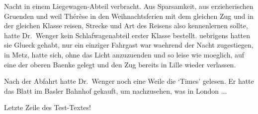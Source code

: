Nacht in einem Liege\-wagen-Abteil verbracht.
Aus Sparsamkeit, aus erzieherischen
Gruenden und weil
Th\'e\-r\`ese in den Weihnachtsferien mit dem gleichen
Zug und in der gleichen Klasse reisen, Strecke und
Art des Reisens also kennenlernen sollte, hatte Dr.~Wenger
kein Schlafwagenabteil erster Klasse bestellt.
uebrigens hatten sie Glueck gehabt, nur ein
einziger Fahrgast war waehrend der Nacht zugestiegen,
in Metz, hatte sich, ohne das Licht anzuzuenden
und so leise wie moeglich, auf eine der oberen
Baenke gelegt und den Zug bereits in Lille wieder
verlassen.\par
Nach der Abfahrt hatte Dr.~Wen\-ger noch eine
Weile die `Times' gelesen. Er hatte das Blatt im
Basler Bahnhof gekauft, um nachzusehen, was in London ...\par
Letzte Zeile des Test-Textes!


